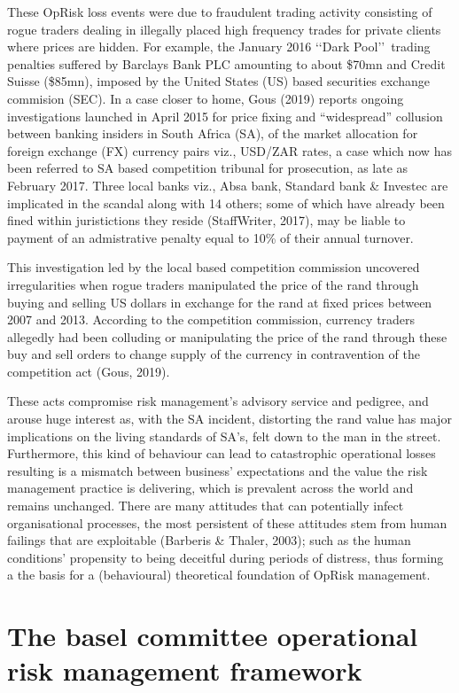 \documentclass{DissertateUSU}
\begin{document}
These OpRisk loss events were due to fraudulent trading activity
consisting of rogue traders dealing in illegally placed high frequency
trades for private clients where prices are hidden. For example, the
January 2016 \lq\lq Dark Pool\rq\rq~trading penalties suffered by
Barclays Bank PLC amounting to about \$70mn and Credit Suisse (\$85mn),
imposed by the United States (US) based securities exchange commision
(SEC). In a case closer to home, Gous (2019) reports ongoing
investigations launched in April 2015 for price fixing and
``widespread'' collusion between banking insiders in South Africa (SA),
of the market allocation for foreign exchange (FX) currency pairs viz.,
USD/ZAR rates, a case which now has been referred to SA based
competition tribunal for prosecution, as late as February 2017. Three
local banks viz., Absa bank, Standard bank \& Investec are implicated in
the scandal along with 14 others; some of which have already been fined
within juristictions they reside (StaffWriter, 2017), may be liable to
payment of an admistrative penalty equal to 10\% of their annual
turnover.\medskip

This investigation led by the local based competition commission
uncovered irregularities when rogue traders manipulated the price of the
rand through buying and selling US dollars in exchange for the rand at
fixed prices between 2007 and 2013. According to the competition
commission, currency traders allegedly had been colluding or
manipulating the price of the rand through these buy and sell orders to
change supply of the currency in contravention of the competition act
(Gous, 2019).\medskip

These acts compromise risk management's advisory service and pedigree,
and arouse huge interest as, with the SA incident, distorting the rand
value has major implications on the living standards of SA's, felt down
to the man in the street. Furthermore, this kind of behaviour can lead
to catastrophic operational losses resulting is a mismatch between
business' expectations and the value the risk management practice is
delivering, which is prevalent across the world and remains unchanged.
There are many attitudes that can potentially infect organisational
processes, the most persistent of these attitudes stem from human
failings that are exploitable (Barberis \& Thaler, 2003); such as the
human conditions' propensity to being deceitful during periods of
distress, thus forming a the basis for a (behavioural) theoretical
foundation of OpRisk management.

\section{The basel committee operational risk management framework}
\label{sec:The basel committee operational risk management framework}
\end{document}

